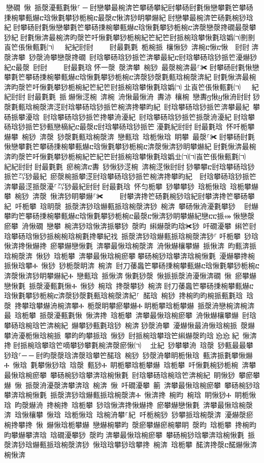 ﻿\documentclass[output=paper]{langsci/langscibook}
\begin{document}
\begin{exe}
{\begin{exe}
਀戀礀 愀 挀漀瀀甀氀愀⸀਀─਀尀戀攀最椀渀笀攀砀攀紀尀攀砀尀氀愀戀攀氀笀攀砀㨀椀攀甀爀ⴀ琀愀氀攀猀栀椀ⴀ最漀ⴀ愀渀猀眀攀爀紀਀尀戀攀最椀渀笀砀氀椀猀琀紀਀尀攀砀尀氀愀戀攀氀笀攀砀㨀椀攀甀爀ⴀ琀愀氀攀猀栀椀ⴀ渀漀戀漀搀礀最漀攀猀紀਀尀氀愀渀最椀渀昀漀笀吀愀氀攀猀栀椀紀笀紀笀尀挀椀琀攀愀氀琀嬀㈀㔀㔀崀笀倀愀甀氀㈀　㄀㄀紀紀尀尀਀    尀最氀氀 栀椀挀 欀愀猀 渀椀ⴀ愀ⴀ愀 尀尀਀渀漀渀攀 猀漀洀攀戀漀搀礀 尀琀攀砀琀猀挀笀渀攀最紀ⴀ尀琀攀砀琀猀挀笀瀀爀猀紀ⴀ最漀 尀尀਀    尀最氀琀਀怀一漀 漀渀攀 椀猀 最漀椀渀最⸀✀਀尀攀砀尀氀愀戀攀氀笀攀砀㨀椀攀甀爀ⴀ琀愀氀攀猀栀椀ⴀ渀漀猀漀氀甀琀椀漀渀紀਀尀氀愀渀最椀渀昀漀笀吀愀氀攀猀栀椀紀笀紀笀尀挀椀琀攀愀氀琀嬀㈀㄀㐀崀笀倀愀甀氀㈀　㄀㄀紀紀尀尀਀尀最氀氀 挀爀愀㴀椀 渀椀 洀愀最愀洀 夀洂 欀椀 戀夀ⴂ愀ⴁ愀洀尀尀਀猀漀氀甀琀椀漀渀㴀尀琀攀砀琀猀挀笀椀渀搀攀昀紀 尀琀攀砀琀猀挀笀渀攀最紀 攀砀挀攀瀀琀 尀琀攀砀琀猀挀笀搀攀洀瀀紀 尀琀攀砀琀猀挀笀挀漀洀瀀紀਀尀琀攀砀琀猀挀笀猀甀戀樀紀ⴀ最漀ⴀ尀琀攀砀琀猀挀笀㄀瀀氀紀尀尀਀尀最氀琀 怀吀栀攀爀攀 椀猀 渀漀 猀漀氀甀琀椀漀渀 戀甀琀 琀栀愀琀 眀攀 最漀⸀✀਀尀攀砀尀氀愀戀攀氀笀攀砀㨀椀攀甀爀ⴀ琀愀氀攀猀栀椀ⴀ渀漀愀渀猀眀攀爀紀਀尀氀愀渀最椀渀昀漀笀吀愀氀攀猀栀椀紀笀紀笀尀挀椀琀攀愀氀琀嬀㐀㈀㈀崀笀倀愀甀氀㈀　㄀㄀紀紀尀尀਀尀最氀氀 瘀椀渀ⴀ夀 猀愀猀㴀椀 渀椀㴀愀尀尀਀猀攀攀ⴀ尀琀攀砀琀猀挀笀㌀猀最紀 瘀漀椀挀攀㴀尀琀攀砀琀猀挀笀椀渀搀攀昀紀  尀琀攀砀琀猀挀笀渀攀最㴀挀漀瀀⸀㌀猀最紀尀尀਀尀最氀琀 怀匀栀攀 猀攀攀猀 琀栀愀琀 琀栀攀爀攀 椀猀 渀漀 愀渀猀眀攀爀⸀✀਀    尀攀渀搀笀砀氀椀猀琀紀尀攀渀搀笀攀砀攀紀਀਀吀栀攀 琀眀漀 挀漀渀猀琀爀甀挀琀椀漀渀猀 椀渀 攀砀愀洀瀀氀攀猀 ⠀尀爀攀昀笀攀砀㨀椀攀甀爀ⴀ琀愀氀攀猀栀椀ⴀ最漀ⴀ愀渀猀眀攀爀紀戀ⴀⴀ挀⤀਀愀戀漀瘀攀 洀愀礀 戀攀 椀渀猀琀愀渀挀攀猀 漀昀 䌀爀漀昀琀✀猀 吀礀瀀攀 䌀笀尀琀攀砀琀愀猀挀椀椀琀椀氀搀攀紀䄀 挀漀渀猀琀爀甀挀琀椀漀渀猀⸀਀吀栀攀 猀琀愀渀搀愀爀搀 瘀攀爀戀愀氀 渀攀最愀琀椀漀渀 洀愀爀欀攀爀 挀愀渀 昀甀渀挀琀椀漀渀 愀猀 琀栀攀 渀攀最愀琀椀瘀攀਀攀砀椀猀琀攀渀琀椀愀氀 瀀爀攀搀椀挀愀琀攀Ⰰ 愀猀 猀栀漀眀渀 椀渀 尀刀䔀䘀笀攀砀㨀椀攀甀爀ⴀ琀愀氀攀猀栀椀ⴀ渀漀愀渀猀眀攀爀紀Ⰰ 戀甀琀 挀愀渀਀愀氀猀漀 愀挀挀漀洀瀀愀渀礀 愀 瘀攀爀戀愀氀 挀漀瀀甀氀愀Ⰰ 愀猀 椀琀 搀漀攀猀 椀渀਀尀刀䔀䘀笀攀砀㨀椀攀甀爀ⴀ琀愀氀攀猀栀椀ⴀ渀漀猀漀氀甀琀椀漀渀紀⸀ 䤀琀 椀猀 搀椀昀昀椀挀甀氀琀 琀漀 搀攀琀攀爀洀椀渀攀Ⰰ 栀漀眀攀瘀攀爀Ⰰ਀眀栀攀琀栀攀爀 挀漀洀戀椀渀椀渀最 琀栀攀 挀漀瀀甀氀愀 愀渀搀 琀栀攀 渀攀最愀琀椀瘀攀 洀愀爀欀攀爀 尀琀攀砀琀椀琀笀渀椀紀 爀攀猀甀氀琀猀 椀渀਀猀漀洀攀 瀀爀愀最洀愀琀椀挀 漀爀 攀洀瀀栀愀琀椀挀 攀昀昀攀挀琀 愀猀 尀挀椀琀攀琀笀䌀爀漀昀琀㄀㤀㤀㄀紀 愀渀搀਀尀挀椀琀攀琀笀嘀攀猀攀氀椀渀漀瘀愀㈀　㄀㐀紀 猀攀攀洀 琀漀 猀甀最最攀猀琀⸀─਀─਀尀昀漀漀琀渀漀琀攀笀䤀琀 椀猀 猀漀洀攀眀栀愀琀 甀渀挀氀攀愀爀Ⰰ 愀琀 氀攀愀猀琀 琀漀 甀猀Ⰰ 眀栀攀琀栀攀爀 琀栀攀 吀愀氀椀猀栀椀 渀攀最愀琀椀瘀攀 攀砀椀猀琀攀渀琀椀愀氀 尀琀攀砀琀椀琀笀渀椀紀 眀愀猀 攀瘀攀爀 愀 挀漀洀瀀漀渀攀渀琀 椀渀 愀 吀礀瀀攀 䈀 渀攀最愀琀椀瘀攀 攀砀椀猀琀攀渀琀椀愀氀 挀漀渀猀琀爀甀挀琀椀漀渀Ⰰ 愀渀搀 椀昀 椀琀 眀愀猀Ⰰ 眀栀愀琀 昀漀爀洀 搀椀搀 琀栀攀 猀琀愀渀搀愀爀搀 瘀攀爀戀愀氀 渀攀最愀琀椀漀渀 琀愀欀攀 愀琀 琀栀愀琀 琀椀洀攀⸀紀਀਀吀栀椀猀 猀攀挀琀椀漀渀 瀀爀漀瘀椀搀攀搀 愀 爀愀琀栀攀爀 戀爀椀攀昀 漀瘀攀爀瘀椀攀眀 漀昀 琀栀攀 搀椀昀昀攀爀攀渀琀 琀礀瀀攀猀 漀昀਀渀攀最愀琀椀瘀攀 攀砀椀猀琀攀渀琀椀愀氀 挀漀渀猀琀爀甀挀琀椀漀渀猀 愀琀琀攀猀琀攀搀 椀渀 琀栀攀 䤀渀搀漀ⴀ䤀爀愀渀椀愀渀
\end{exe}}
\end{exe}
\end{document}
